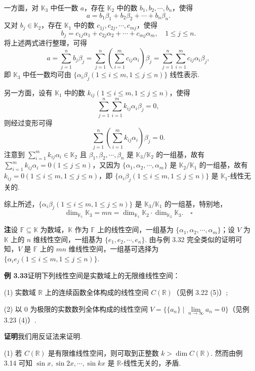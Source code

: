 \documentclass[UTF8,12pt,a4paper,fontset=fandol]{ctexart}
\begin{document}
一方面，对 $\mathbb{K}_3$ 中任一数 $a$，存在 $\mathbb{K}_2$ 中的数 $b_1,b_2,\cdots,b_n$，使得
\[
a=b_1\beta_1+b_2\beta_2+\cdots+b_n\beta_n.
\]
又对 $b_j\in\mathbb{K}_2$，存在 $\mathbb{K}_1$ 中的数 $c_{1j},c_{2j},\cdots,c_{mj}$，使得
\[
b_j=c_{1j}\alpha_1+c_{2j}\alpha_2+\cdots+c_{mj}\alpha_m,\quad 1\le j\le n.
\]
将上述两式进行整理，可得
\[
a=\sum_{j=1}^n b_j\beta_j=\sum_{j=1}^n\left(\sum_{i=1}^m c_{ij}\alpha_i\right)\beta_j
=\sum_{j=1}^n\sum_{i=1}^m c_{ij}\alpha_i\beta_j,
\]
即 $\mathbb{K}_3$ 中任一数均可由 $\{\alpha_i\beta_j(1\le i\le m,1\le j\le n)\}$ 线性表示.

另一方面，设有 $\mathbb{K}_1$ 中的数 $k_{ij}(1\le i\le m,1\le j\le n)$，使得
\[
\sum_{j=1}^n\sum_{i=1}^m k_{ij}\alpha_i\beta_j=0,
\]
则经过变形可得
\[
\sum_{j=1}^n\left(\sum_{i=1}^m k_{ij}\alpha_i\right)\beta_j=0.
\]
注意到 $\sum_{i=1}^m k_{ij}\alpha_i\in\mathbb{K}_2$ 且 $\beta_1,\beta_2,\cdots,\beta_n$ 是 $\mathbb{K}_3/\mathbb{K}_2$ 的一组基，故有 $\sum_{i=1}^m k_{ij}\alpha_i=0(1\le j\le n)$，又因为 $\{\alpha_1,\alpha_2,\cdots,\alpha_m\}$ 是 $\mathbb{K}_2/\mathbb{K}_1$ 的一组基，故有 $k_{ij}=0(1\le i\le m,1\le j\le n)$，即 $\{\alpha_i\beta_j(1\le i\le m,1\le j\le n)\}$ 是 $\mathbb{K}_1$-线性无关的.

综上所述，$\{\alpha_i\beta_j(1\le i\le m,1\le j\le n)\}$ 是 $\mathbb{K}_3/\mathbb{K}_1$ 的一组基，特别地，
\[
\dim_{\mathbb{K}_1}\mathbb{K}_3=mn=\dim_{\mathbb{K}_1}\mathbb{K}_2\cdot\dim_{\mathbb{K}_2}\mathbb{K}_3. \quad \square
\]

\noindent\textbf{注}\quad 设 $\mathbb{F}\subseteq\mathbb{K}$ 为数域，$\mathbb{K}$ 作为 $\mathbb{F}$ 上的线性空间，一组基为 $\{\alpha_1,\alpha_2,\cdots,\alpha_m\}$；设 $V$ 为 $\mathbb{K}$ 上的 $n$ 维线性空间，一组基为 $\{e_1,e_2,\cdots,e_n\}$. 由与例 3.32 完全类似的证明可知，$V$ 是 $\mathbb{F}$ 上的 $mn$ 维线性空间，一组基可选择为 $\{\alpha_i e_j(1\le i\le m,1\le j\le n)\}$.

\noindent\textbf{例 3.33}\quad 证明下列线性空间是实数域上的无限维线性空间：

(1) 实数域 $\mathbb{R}$ 上的连续函数全体构成的线性空间 $C(\mathbb{R})$（见例 3.22 (5)）;

(2) 以 0 为极限的实数数列全体构成的线性空间 $V=\{\{a_n\}\mid \lim\limits_{n\to\infty}a_n=0\}$（见例 3.23 (4)）.

\noindent\textbf{证明}\quad 我们用反证法来证明.

(1) 若 $C(\mathbb{R})$ 是有限维线性空间，则可取到正整数 $k>\dim C(\mathbb{R})$. 然而由例 3.14 可知 $\sin x,\sin 2x,\cdots,\sin kx$ 是 $\mathbb{R}$-线性无关的，矛盾.
\end{document}
